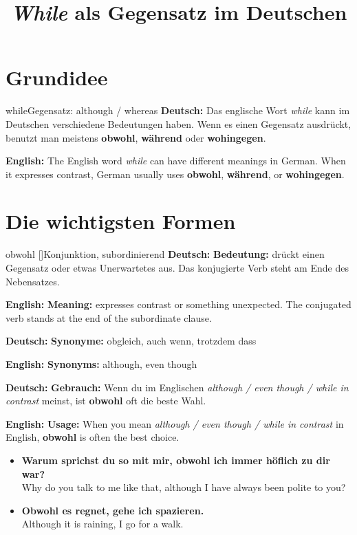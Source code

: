 \documentclass[a4paper,11pt]{article}
\title{\textit{While} als Gegensatz im Deutschen}
\date{}
\newcommand{\GermanText}[1]{\textbf{Deutsch: }#1\par}
\newcommand{\EnglishText}[1]{{\small\color{SoftGray}\textbf{English: }#1\par}}
\newcommand{\ExampleItem}[2]{\item \textbf{#1}\\{\small\color{SoftGray}#2}}
\begin{document}
    \maketitle
    \tableofcontents
    \newpage

\section{Grundidee}

\begin{grammarentry}{while}{Gegensatz: although / whereas}
\GermanText{Das englische Wort \textit{while} kann im Deutschen verschiedene Bedeutungen haben. Wenn es einen Gegensatz ausdrückt, benutzt man meistens \textbf{obwohl}, \textbf{während} oder \textbf{wohingegen}.}
\EnglishText{The English word \textit{while} can have different meanings in German. When it expresses contrast, German usually uses \textbf{obwohl}, \textbf{während}, or \textbf{wohingegen}.}
\end{grammarentry}

\section{Die wichtigsten Formen}

\begin{grammarentry}{obwohl []}{Konjunktion, subordinierend}
\GermanText{\textbf{Bedeutung:} drückt einen Gegensatz oder etwas Unerwartetes aus. Das konjugierte Verb steht am Ende des Nebensatzes.}
\EnglishText{\textbf{Meaning:} expresses contrast or something unexpected. The conjugated verb stands at the end of the subordinate clause.}

\GermanText{\textbf{Synonyme:} obgleich, auch wenn, trotzdem dass}
\EnglishText{\textbf{Synonyms:} although, even though}

\GermanText{\textbf{Gebrauch:} Wenn du im Englischen \textit{although / even though / while in contrast} meinst, ist \textbf{obwohl} oft die beste Wahl.}
\EnglishText{\textbf{Usage:} When you mean \textit{although / even though / while in contrast} in English, \textbf{obwohl} is often the best choice.}

\begin{exbox}
\begin{itemize}
    \ExampleItem{Warum sprichst du so mit mir, obwohl ich immer höflich zu dir war?}{Why do you talk to me like that, although I have always been polite to you?}
    \ExampleItem{Obwohl es regnet, gehe ich spazieren.}{Although it is raining, I go for a walk.}
\end{itemize}
\end{exbox}
\end{grammarentry}
\end{document}
